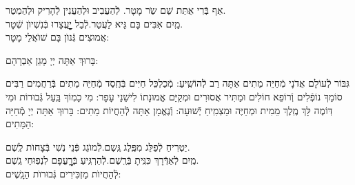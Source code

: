 \documentclass[twoside, openany, parskip=half, 11pt]{book}
\begin{document}
\begin{sometimes}


 אַף בְּֿרִי אֻתַּת שֵׁם שַֹר מָטָר. \hfill לְֿהַעֲבִיב וּלְהַעֲנִין לְֿהָרִיק וּלְהַמְטַר.\\
 מַֽיִם אִבִּים בָּם גֵּיא לַעֲטַר.\hfill לְֿבַל יׇׇׇׇׇׇׇׇׇׇׇׇָעֳצָרוּ בְּֿנִשְׁיוׂן שְֿׁטָר.\\
 אֲמוּצִים גְּֿנוׂן בָּם שׁוׂאֲלֵי מָטָר:



בָּרוּךְ אַתָּה יְיָ מָגֵן אַבְרָהָם:

 גִּבּוֹר לְֿעוֹלָם אֲדֹנָי מְֿחַיֵּה מֵתִים אַתָּה רַב לְֿהוֹשִֽׁיעַ: מְֿכַלְכֵּל חַיִּים בְּֿחֶֽסֶד מְֿחַיֵּה מֵתִים בְּֿרַחֲמִים רַבִּים סוֹמֵךְ נוֹפְֿלִים וְֿרוֹפֵא חוֹלִים וּמַתִּיר אֲסוּרִים וּמְקַיֵּם אֱמוּנָתוֹ לִישֵׁנֵי עָפָר: מִי כָמֽוֹךָ בַּֽעַל גְּֿבוּרוֹת וּמִי דּֽוֹמֶה לָּךְ מֶֽלֶךְ מֵמִית וּמְחַיֶּה וּמַצְמִֽיחַ יְֿשׁוּעָה: וְֿנֶאֱמָן אַתָּה לְֿהַחֲיוֹת מֵתִים: בָּרוּךְ אַתָּה יְיָ מְֿחַיֵּה הַמֵּתִים:





יַטְרִיחַ לְֿפַלֵּג מִפֶּֽלֶג גֶּֽשֶם.\hfill לְֿמוׂגֵג פְּֿנֵי נֶשִׁי בְּֿצָחוׂת לֶֽשֶׁם.\\
 מַֽיִם לְֿאַדְּֿֿרָךְ כִּנִּֽיתָ בְּֿרֶֽשֶׁם.\hfill לְֿהַרְגִּֽיעַ בְּֿרׇׇׇׇׇׇׇׇָעֳפָם לִנְפֽוּחֵי גֶֽשֶׁם.\\
 לְֿהַחֲיוׂת מַזְכִּירִים גְּֿבוּרוׂת הַגָֽשֶׁים:



\end{sometimes}
\end{document}
